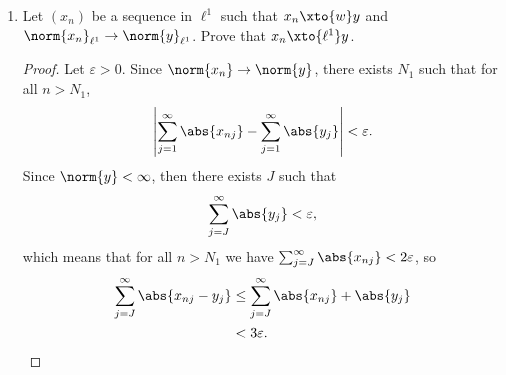 \documentclass[12pt,letterpaper]{article}
\renewcommand{\phi}{\varphi}
\renewcommand{\epsilon}{\varepsilon}
\begin{document}
\begin{enumerate}
(ii) Show that convergence of a sequence $(\phi_n)_{n=1}^\infty$ in this topology is equivalent to weak* convergence. 

\begin{proof}
(i) Denote the set of all weak* neighborhoods by $\script{B}$. Note that $\script{B}$ covers $X^*$ since $W(\phi;0)$ is the whole space for any $\phi\in X^*$. 

Let $W(\phi_1,x), W(\phi_2,y) \in \script{B}$. 


For any $\psi$ in the intersection of these two weak* neighborhoods, 
\begin{align*}
\abs{\angles{\psi,x}-\angles{\phi_1,x}}&<1 \text{ and} \\
\abs{\angles{\psi,y}-\angles{\phi_2,y}}&<1,
\end{align*}
so if we denote $r$ as the smaller of the two quantities above, then 
$$\psi \in W_r(\psi;x,y) \subset W(\phi_1;x) \cap W(\phi_2;y).$$
Since this holds for two arbitrary weak* neighborhoods, then it holds for finitely many. Therefore $\script{B}$ is a basis for a topology. \qedwhite 


(ii) Denote convergence in the topology by $\phi_n\xto{T}\phi$. 

Suppose $\phi_n\xto{T}\phi$. Then by definition, for every $\epsilon>0$ and $x\in X$, there exists $N>0$ such that for all $n>N$, 
$$\phi_n\in W_\epsilon(\phi;x),$$
which is to say 
$$\abs{\angles{\phi_n,x}-\angles{\phi,x}}<\epsilon,$$
which statement is exactly the definition of 
$$\phi_n\xto{w^*}\phi.$$ 
This proof also works in reverse, so we are done.
\end{proof}

\item Let $(x_n)$ be a sequence in $\ell^1$ such that $x_n\xto{w}y$ and $\norm{x_n}_{\ell^1}\to\norm{y}_{\ell^1}$. Prove that $x_n\xto{\ell^1} y$. 


\begin{proof}
Let $\epsilon>0$. Since $\norm{x_n}\to\norm{y}$, there exists $N_1$ such that for all $n>N_1$, 
$$\left|\sum_{j=1}^\infty\abs{x_{nj}}-\sum_{j=1}^\infty\abs{y_j}\right|<\epsilon.$$
Since $\norm{y}<\infty$, then there exists $J$ such that 
$$\sum_{j=J}^\infty\abs{y_j}<\epsilon,$$ 
which means that for all $n>N_1$ we have $\sum_{j=J}^\infty\abs{x_{nj}}<2\epsilon$, so 
\begin{align}
\sum_{j=J}^\infty \abs{x_{nj}-y_j} &\leq \sum_{j=J}^\infty \abs{x_{nj}}+\abs{y_j} \nonumber \\
&< 3\epsilon.
\end{align}


\end{proof}
\end{enumerate}
\end{document}
